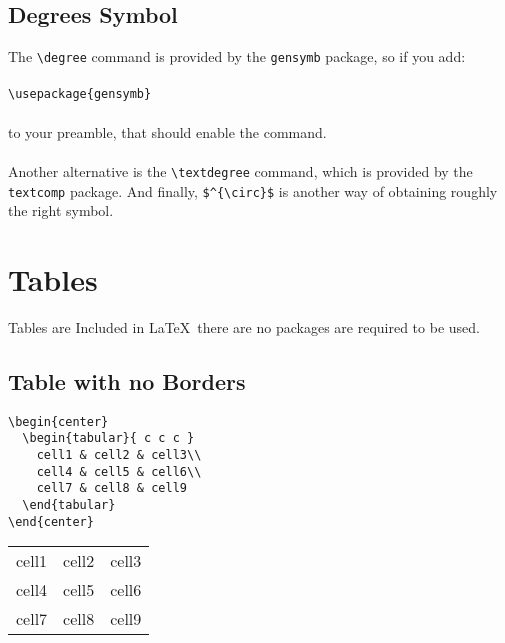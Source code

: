 \documentclass[10pt, letterpaper]{article}
\begin{document}
\subsection{Degrees Symbol}
The \verb|\degree| command is provided by the \verb|gensymb| package, so if you add:\\
\\
\verb|\usepackage{gensymb}|\\
\\
to your preamble, that should enable the command.\\
\\
Another alternative is the \verb|\textdegree| command, which is provided by the \verb|textcomp| package. And finally, \verb|$^{\circ}$| is another way of obtaining roughly the right symbol.


\section{Tables}
Tables are Included in \LaTeX ~there are no packages are required to be used.
\subsection{Table with no Borders}
\begin{multicols}{2}
\lstset{style=basicstyle}
\begin{lstlisting}[]
\begin{center}
  \begin{tabular}{ c c c }
    cell1 & cell2 & cell3\\
    cell4 & cell5 & cell6\\
    cell7 & cell8 & cell9
  \end{tabular}
\end{center}
\end{lstlisting}
\columnbreak
\begin{center}
  \begin{tabular}{ c c c }
    cell1 & cell2 & cell3\\
    cell4 & cell5 & cell6\\
    cell7 & cell8 & cell9
  \end{tabular}
\end{center}
\end{multicols}
\end{document}
